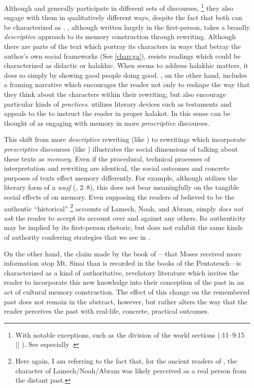 Although \ga and \jub generally participate in different sets of discourses,%
    \footnote{With notable exceptions, such as the division of the world sections (:11--9:15 ||  ). See especially \cite[105--130]{machiela2009}.}
they also engage with them in qualitatively different ways, despite the fact that both can be characterized as \psa. \GA, although written largely in the first-person, takes a broadly \emph{descriptive} approach to its memory construction through rewriting. Although there are parts of the text which portray its characters in ways that betray the author's own social frameworks (See \autoref{chap:ga}), \ga resists readings which could be characterized as didactic or halakhic. When \ga seems to address halakhic matters, it does so simply by showing good people doing good. \jub, on the other hand, includes a framing narrative which encourages the reader not only to reshape the way that they think about the characters within their rewriting, but also encourage particular kinds of \emph{practices}. \jub utilizes literary devices such as testaments and appeals to the \HT to instruct the reader in proper halakot. In this sense \jub can be thought of as engaging with memory in more \emph{prescriptive} discourses.

This shift from more \emph{descriptive} rewriting (like \ga) to rewritings which incorporate \emph{prescriptive} discourses (like \jub) illustrates the social dimensions of talking about these texts as \emph{memory}. Even if the procedural, technical processes of interpretation and rewriting are identical, the social outcomes and concrete purposes of texts effect memory differently. For example, although \ga utilizes the literary form of a \emph{waṣf} (, 2--8), this does not bear meaningfully on the tangible social effects of \ga on memory. Even supposing the readers of \ga believed \ga to be the authentic ``historical''%
    \footnote{Here again, I am referring to the fact that, for the ancient readers of \jub, the character of Lamech/Noah/Abram was likely perceived as a real person from the distant past.}
accounts of Lamech, Noah, and Abram, \ga simply \emph{does not ask} the reader to accept its account over and against any others. Its authenticity may be implied by its first-person rhetoric, but \ga does not exhibit the same kinds of authority conferring strategies that we see in \jub. 

On the other hand, the claim made by the book of \jub---that Moses received more information atop Mt. Sinai than is recorded in the books of the Pentateuch---is characterized as a kind of authoritative, revelatory literature which invites the reader to incorporate this new knowledge into their conception of the past in an act of cultural memory construction. The effect of this change on the remembered past does not remain in the abstract, however, but rather alters the way that the reader perceives the past with real-life, concrete, practical outcomes. 


